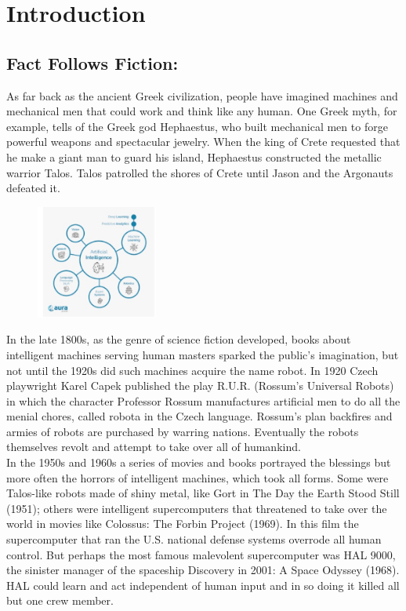 \documentclass[12pt]{article}
\begin{document}
    \newpage
    \tableofcontents
    \newpage
\Huge\section{Introduction} 
\huge \subsection{Fact Follows Fiction:}\large\flushleft As far back as the ancient Greek civilization, people have imagined machines and mechanical men that could work and think like any human. One Greek myth, for example, tells of the Greek god Hephaestus, who built mechanical men to forge powerful weapons and spectacular jewelry. When the king of Crete requested that he make a giant man to guard his island, Hephaestus constructed the metallic warrior Talos. Talos patrolled the shores of Crete until Jason and the Argonauts defeated it.\\
\begin{figure}[h]
\center
  \includegraphics[width=4cm]{Image/IMG_20200125_232757.jpg}
  \caption{}
 
\end{figure}
 In the late 1800s, as the genre of science fiction developed, books about intelligent machines serving human masters sparked the public’s imagination, but not until the 1920s did such machines acquire the name robot. In 1920 Czech playwright Karel Capek published the play R.U.R. (Rossum’s Universal Robots) in which the character Professor Rossum manufactures artificial men to do all the menial chores, called robota in the Czech language. Rossum’s plan backfires and armies of robots are purchased by warring nations. Eventually the robots themselves revolt and attempt to take over all of humankind.\\ 
 In the 1950s and 1960s a series of movies and books portrayed the blessings but more often the horrors of intelligent machines, which took all forms. Some were Talos-like robots made of shiny metal, like Gort in The Day the Earth Stood Still (1951); others were intelligent supercomputers that threatened to take over the world in movies like Colossus: The Forbin Project (1969). In this film the supercomputer that ran the U.S. national defense systems overrode all human control. But perhaps the most famous malevolent supercomputer was HAL 9000, the sinister manager of the spaceship Discovery in 2001: A Space Odyssey (1968). HAL could learn and act independent of human input and in so doing it killed all but one crew member.\\
 
\end{document}
